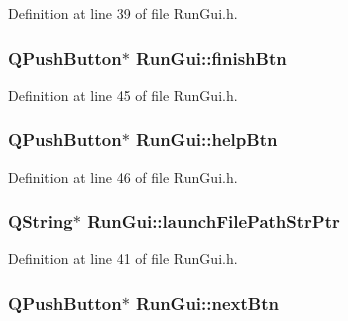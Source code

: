 Definition at line 39 of file Run\-Gui.\-h.

\hypertarget{class_run_gui_a2989fde08a236488c152c8fa584c3380}{
\subsubsection[{finish\-Btn}]{\setlength{\rightskip}{0pt plus 5cm}Q\-Push\-Button$\ast$ Run\-Gui\-::finish\-Btn\hspace{0.3cm}{\ttfamily [private]}}}\label{class_run_gui_a2989fde08a236488c152c8fa584c3380}


Definition at line 45 of file Run\-Gui.\-h.

\hypertarget{class_run_gui_a6c0a17f55049da888442fbc28dff7a78}{
\subsubsection[{help\-Btn}]{\setlength{\rightskip}{0pt plus 5cm}Q\-Push\-Button$\ast$ Run\-Gui\-::help\-Btn\hspace{0.3cm}{\ttfamily [private]}}}\label{class_run_gui_a6c0a17f55049da888442fbc28dff7a78}


Definition at line 46 of file Run\-Gui.\-h.

\hypertarget{class_run_gui_a3766ac7d4bfae38eb0d9f535f0d9bcf5}{
\subsubsection[{launch\-File\-Path\-Str\-Ptr}]{\setlength{\rightskip}{0pt plus 5cm}Q\-String$\ast$ Run\-Gui\-::launch\-File\-Path\-Str\-Ptr\hspace{0.3cm}{\ttfamily [private]}}}\label{class_run_gui_a3766ac7d4bfae38eb0d9f535f0d9bcf5}


Definition at line 41 of file Run\-Gui.\-h.

\hypertarget{class_run_gui_a02bb63cd6c6d77933f98087111ce1a66}{
\subsubsection[{next\-Btn}]{\setlength{\rightskip}{0pt plus 5cm}Q\-Push\-Button$\ast$ Run\-Gui\-::next\-Btn\hspace{0.3cm}{\ttfamily [private]}}}\label{class_run_gui_a02bb63cd6c6d77933f98087111ce1a66}


